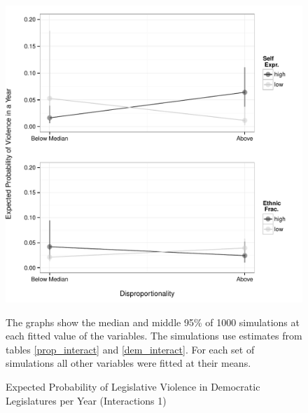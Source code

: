 \documentclass[a4paper]{article}\usepackage[]{graphicx}\usepackage[]{color}
\newenvironment{knitrout}{}{} %
\begin{document}
\begin{figure}[H]
    \begin{center}
\begin{knitrout}
\color{fgcolor}
\includegraphics[width=0.95\linewidth]{figure/predProInteract1-1} 

\end{knitrout}

    \end{center}
    \caption{Expected Probability of Legislative Violence in Democratic Legislatures per Year (Interactions 1)}
    \label{interact_plots1}
    \begin{singlespace}
      {\scriptsize{The graphs show the median and middle 95\% of 1000 simulations at each fitted value of the variables. The simulations use estimates from tables \ref{prop_interact} and \ref{dem_interact}. For each set of simulations all other variables were fitted at their means.}}
    \end{singlespace}
\end{figure}
\end{document}
